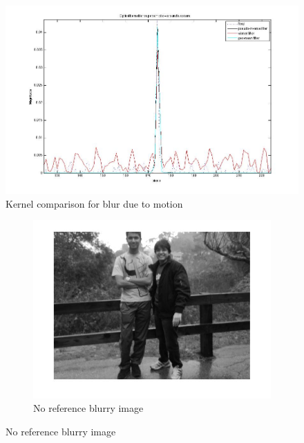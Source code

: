 \begin{figure}[h!]
  \centering
                \centering
                \includegraphics[width=.5\textwidth]{kernel_motion.jpg}
                \caption{Kernel comparison for blur due to motion}
                \end{figure}

\begin{figure}
        \centering
        \begin{subfigure}[b]{0.4\textwidth}
                \centering
                \includegraphics[width=\textwidth]{blur_personal.jpg}
                \caption{No reference blurry image}
                

\end{subfigure}
\end{figure}
